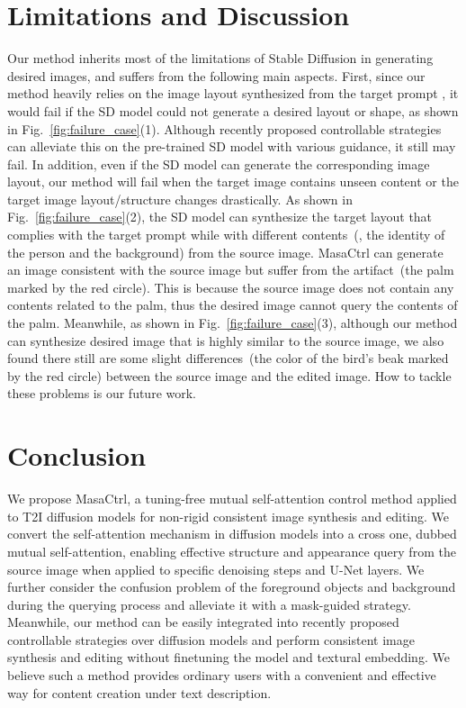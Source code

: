 \documentclass[10pt,twocolumn,letterpaper]{article}
\begin{document}
\section{Limitations and Discussion}
Our method inherits most of the limitations of Stable Diffusion in generating desired images, and suffers from the following main aspects. First, since our method heavily relies on the image layout synthesized from the target prompt , it would fail if the SD model could not generate a desired layout or shape, as shown in Fig.~\ref{fig:failure_case}(1). Although recently proposed controllable strategies~\cite{mou2023t2i, zhang2023adding} can alleviate this on the pre-trained SD model with various guidance, it still may fail. In addition, even if the SD model can generate the corresponding image layout, our method will fail when the target image contains unseen content or the target image layout/structure changes drastically. As shown in Fig.~\ref{fig:failure_case}(2), the SD model can synthesize the target layout that complies with the target prompt  while with different contents~(\ie, the identity of the person and the background) from the source image. MasaCtrl can generate an image consistent with the source image but suffer from the artifact~(the palm marked by the red circle). This is because the source image does not contain any contents related to the palm, thus the desired image cannot query the contents of the palm. Meanwhile, as shown in Fig.~\ref{fig:failure_case}(3), although our method can synthesize desired image that is highly similar to the source image, we also found there still are some slight differences~(the color of the bird's beak marked by the red circle) between the source image and the edited image. How to tackle these problems is our future work. 

\section{Conclusion}
We propose MasaCtrl, a tuning-free mutual self-attention control method applied to T2I diffusion models for non-rigid consistent image synthesis and editing. We convert the self-attention mechanism in diffusion models into a cross one, dubbed mutual self-attention, enabling effective structure and appearance query from the source image when applied to specific denoising steps and U-Net layers. We further consider the confusion problem of the foreground objects and background during the querying process and alleviate it with a mask-guided strategy. Meanwhile, our method can be easily integrated into recently proposed controllable strategies over diffusion models and perform consistent image synthesis and editing without finetuning the model and textural embedding. We believe such a method provides ordinary users with a convenient and effective way for content creation under text description.


\clearpage

{\small


}
\end{document}
